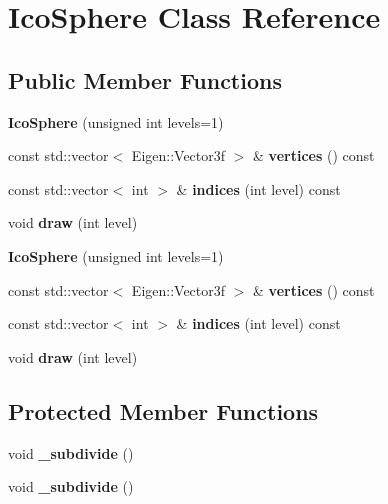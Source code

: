 \hypertarget{class_ico_sphere}{}\section{Ico\+Sphere Class Reference}
\label{class_ico_sphere}
\subsection*{Public Member Functions}
\begin{DoxyCompactItemize}
\item 
\mbox{\label{class_ico_sphere_a9448496c610787615714f1859222552a}} 
{\bfseries Ico\+Sphere} (unsigned int levels=1)
\item 
\mbox{\label{class_ico_sphere_a09b068c23589f154e038b9b680a205ff}} 
const std\+::vector$<$ Eigen\+::\+Vector3f $>$ \& {\bfseries vertices} () const
\item 
\mbox{\label{class_ico_sphere_aafcbb05c197d252eca0209d93d503fff}} 
const std\+::vector$<$ int $>$ \& {\bfseries indices} (int level) const
\item 
\mbox{\label{class_ico_sphere_aed61bbb925b80c8ad9506caaf6bb8c2e}} 
void {\bfseries draw} (int level)
\item 
\mbox{\label{class_ico_sphere_a9448496c610787615714f1859222552a}} 
{\bfseries Ico\+Sphere} (unsigned int levels=1)
\item 
\mbox{\label{class_ico_sphere_a09b068c23589f154e038b9b680a205ff}} 
const std\+::vector$<$ Eigen\+::\+Vector3f $>$ \& {\bfseries vertices} () const
\item 
\mbox{\label{class_ico_sphere_a2a0af3249c70343d959532e9516796a8}} 
const std\+::vector$<$ int $>$ \& {\bfseries indices} (int level) const
\item 
\mbox{\label{class_ico_sphere_aed61bbb925b80c8ad9506caaf6bb8c2e}} 
void {\bfseries draw} (int level)
\end{DoxyCompactItemize}
\subsection*{Protected Member Functions}
\begin{DoxyCompactItemize}
\item 
\mbox{\label{class_ico_sphere_a78f6530ab445aaeb87668cda333ffd5b}} 
void {\bfseries \+\_\+subdivide} ()
\item 
\mbox{\label{class_ico_sphere_a78f6530ab445aaeb87668cda333ffd5b}} 
void {\bfseries \+\_\+subdivide} ()
\end{DoxyCompactItemize}
